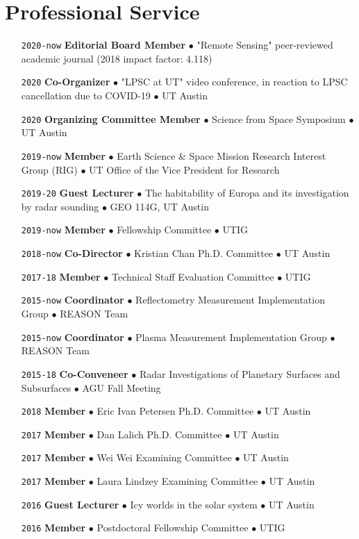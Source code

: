 \section*{Professional Service}

\begin{itemize}[leftmargin=5.8em, labelsep=1.5em]
    \setlength\itemsep{-.5em}
    \item[\texttt{2020-now}] \textbf{Editorial Board Member} $\bullet$ "Remote Sensing" peer-reviewed academic journal (2018 impact factor: 4.118)
    \item[\texttt{2020}] \textbf{Co-Organizer} $\bullet$ "LPSC at UT" video conference, in reaction to LPSC cancellation due to COVID-19 $\bullet$ UT Austin
    \item[\texttt{2020}] \textbf{Organizing Committee Member} $\bullet$ Science from Space Symposium $\bullet$ UT Austin
    \item[\texttt{2019-now}] \textbf{Member} $\bullet$ Earth Science \& Space Mission Research Interest Group (RIG) $\bullet$ UT Office of the Vice President for Research
    \item[\texttt{2019-20}] \textbf{Guest Lecturer} $\bullet$ The habitability of Europa and its investigation by radar sounding $\bullet$  GEO 114G, UT Austin
    \item[\texttt{2019-now}] \textbf{Member} $\bullet$ Fellowship Committee $\bullet$ UTIG
    \item[\texttt{2018-now}] \textbf{Co-Director} $\bullet$ Kristian Chan Ph.D. Committee $\bullet$ UT Austin
    \item[\texttt{2017-18}] \textbf{Member} $\bullet$ Technical Staff Evaluation Committee $\bullet$ UTIG
    \item[\texttt{2015-now}] \textbf{Coordinator} $\bullet$ Reflectometry Measurement Implementation Group $\bullet$ REASON Team
    \item[\texttt{2015-now}] \textbf{Coordinator} $\bullet$ Plasma Measurement Implementation Group $\bullet$ REASON Team
    \item[\texttt{2015-18}] \textbf{Co-Conveneer} $\bullet$  Radar Investigations of Planetary Surfaces and Subsurfaces $\bullet$ AGU Fall Meeting
    \item[\texttt{2018}] \textbf{Member} $\bullet$ Eric Ivan Petersen Ph.D. Committee $\bullet$ UT Austin
    \item[\texttt{2017}] \textbf{Member} $\bullet$ Dan Lalich Ph.D. Committee $\bullet$ UT Austin
    \item[\texttt{2017}] \textbf{Member} $\bullet$ Wei Wei Examining Committee $\bullet$ UT Austin
    \item[\texttt{2017}] \textbf{Member} $\bullet$ Laura Lindzey Examining Committee $\bullet$ UT Austin
    \item[\texttt{2016}] \textbf{Guest Lecturer} $\bullet$ Icy worlds in the solar system $\bullet$ UT Austin
    \item[\texttt{2016}] \textbf{Member} $\bullet$ Postdoctoral Fellowship Committee $\bullet$ UTIG
\end{itemize}

